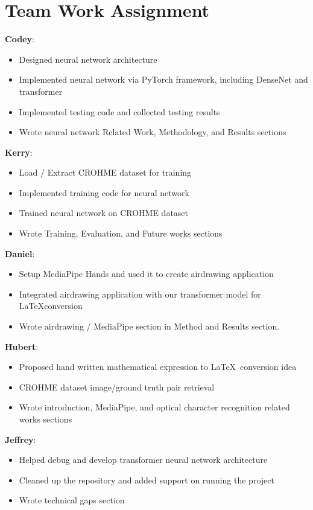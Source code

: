 \section{Team Work Assignment}
\label{sec:contribution}

\textbf{Codey}: 
    \begin{itemize}
        \item Designed neural network architecture
        \item Implemented neural network via PyTorch framework, including DenseNet and transformer
        \item Implemented testing code and collected testing results
        \item Wrote neural network Related Work, Methodology, and Results sections
    \end{itemize}

\textbf{Kerry}:
    \begin{itemize}
        \item Load / Extract CROHME dataset for training
        \item Implemented training code for neural network
        \item Trained neural network on CROHME dataset
        \item Wrote Training, Evaluation, and Future works sections
    \end{itemize}
    
\textbf{Daniel}:
    \begin{itemize}
        \item Setup MediaPipe Hands and used it to create airdrawing application
        \item Integrated airdrawing application with our transformer model for \LaTeX conversion
        \item Wrote airdrawing / MediaPipe section in Method and Results section.
    \end{itemize}

\textbf{Hubert}:
    \begin{itemize}
        \item Proposed hand written mathematical expression to \LaTeX\ conversion idea
        \item CROHME dataset image/ground truth pair retrieval
        \item Wrote introduction, MediaPipe, and optical character recognition related works sections
    \end{itemize}

\textbf{Jeffrey}:
    \begin{itemize}
        \item Helped debug and develop transformer neural network architecture
        \item Cleaned up the repository and added support on running the project
        \item Wrote technical gaps section
    \end{itemize}